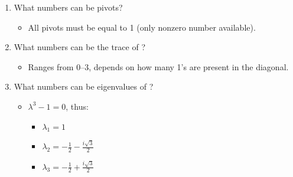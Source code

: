 \begin{itemize}
\begin{enumerate}
{\begin{enumerate}
        \begin{itemize}\color{foreground}
          \item Multiplication by an elementary matrix at most produces a sign flip,
          thus, the determinants are \(\pm 1\).
        \end{itemize}

        \item What numbers can be pivots?
        \begin{itemize}\color{foreground}
          \item All pivots must be equal to 1 (only nonzero number available).
        \end{itemize}

        \item What numbers can be the trace of ?
        \begin{itemize}\color{foreground}
          \item Ranges from 0--3, depends on how many 1's are present in the diagonal.
        \end{itemize}

        \item What numbers can be eigenvalues of ?
        \begin{itemize}\color{foreground}
          \item \(\lambda^3 - 1 = 0\), thus:
            \begin{itemize}
              \item \(\lambda_1 = 1\)
              \item \(\displaystyle \lambda_2 = -\frac{1}{2} - \frac{i\sqrt{3} }{2}\)
              \item \(\displaystyle \lambda_3 = -\frac{1}{2} + \frac{i\sqrt{3}}{2}\)
            \end{itemize}
        \end{itemize}

      \end{enumerate}
    }
  \end{enumerate}
\end{itemize}

